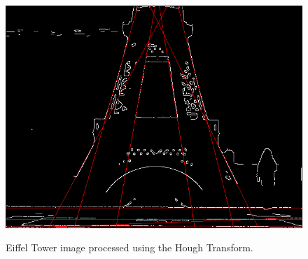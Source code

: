 \begin{figure}[ht!]
\begin{center}
\includegraphics[height=0.4\textwidth]{fig/eiffel_hough}\\
\caption{Eiffel Tower image processed using the Hough Transform.}
\label{fig_eiffel_hough}
\end{center}
\end{figure}
